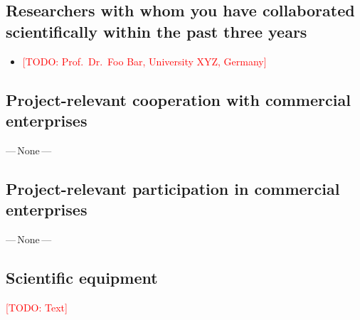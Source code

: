 \documentclass[american,firsttime]{dfgproposal}
\newcommand{\todo}[1]{\xspace{\textcolor{red}{[TODO: #1]}}\xspace}
\begin{document}
	\subsection{Researchers with whom you have collaborated scientifically within the past three years}
	\begin{itemize}
		\item \todo{Prof.~Dr.~Foo Bar, University XYZ, Germany}
	\end{itemize}
	
	\subsection{Project-relevant cooperation with commercial enterprises}
	---\,None\,---
	
	\subsection{Project-relevant participation in commercial enterprises}
	---\,None\,---
	
	\subsection{Scientific equipment}
	\todo{Text}
	
\end{document}
